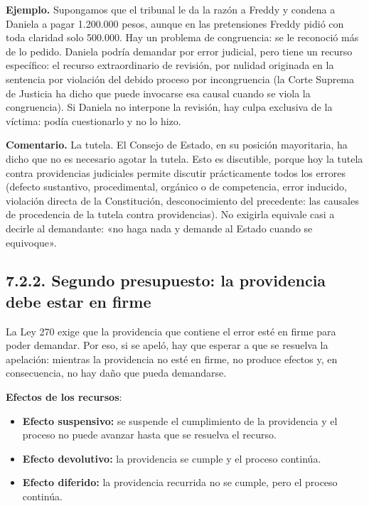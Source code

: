 \begin{ejemplo}
\textcolor[HTML]{4F6228}{\textbf{Ejemplo. }}Supongamos que el tribunal le da la razón a Freddy y condena a Daniela a pagar 1.200.000 pesos, aunque en las pretensiones Freddy pidió con toda claridad solo 500.000. Hay un problema de congruencia: se le reconoció más de lo pedido. Daniela podría demandar por error judicial, pero tiene un recurso específico: el recurso extraordinario de revisión, por nulidad originada en la sentencia por violación del debido proceso por incongruencia (la Corte Suprema de Justicia ha dicho que puede invocarse esa causal cuando se viola la congruencia). Si Daniela no interpone la revisión, hay culpa exclusiva de la víctima: podía cuestionarlo y no lo hizo.
\end{ejemplo}
\begin{comentario}
\textcolor[HTML]{8A6D3B}{\textbf{Comentario. }}La tutela. El Consejo de Estado, en su posición mayoritaria, ha dicho que no es necesario agotar la tutela. Esto es discutible, porque hoy la tutela contra providencias judiciales permite discutir prácticamente todos los errores (defecto sustantivo, procedimental, orgánico o de competencia, error inducido, violación directa de la Constitución, desconocimiento del precedente: las causales de procedencia de la tutela contra providencias). No exigirla equivale casi a decirle al demandante: «no haga nada y demande al Estado cuando se equivoque».
\end{comentario}
\subsection{7.2.2. Segundo presupuesto: la providencia debe estar en firme}
La Ley 270 exige que la providencia que contiene el error esté en firme para poder demandar. Por eso, si se apeló, hay que esperar a que se resuelva la apelación: mientras la providencia no esté en firme, no produce efectos y, en consecuencia, no hay daño que pueda demandarse.

\textbf{Efectos de los recursos}:

\begin{itemize}
\item \textbf{Efecto suspensivo:} se suspende el cumplimiento de la providencia y el proceso no puede avanzar hasta que se resuelva el recurso.
\item \textbf{Efecto devolutivo:} la providencia se cumple y el proceso continúa.
\item \textbf{Efecto diferido:} la providencia recurrida no se cumple, pero el proceso continúa.
\end{itemize}
